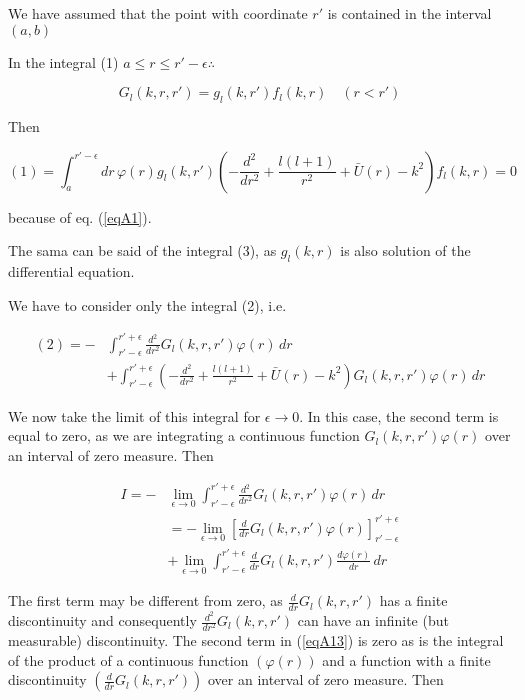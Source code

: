 We have assumed that the point with coordinate $r'$ is contained in the interval $(a,b)$

In the integral (1) $a\leq r  \leq r'-\epsilon \therefore $

\begin{equation*}
G_l(k,r,r')=g_l(k,r')f_l(k,r) \quad (r<  r')
\end{equation*}


Then

\begin{equation}\label{eqA11}
(1)=\int_a^{r'-\epsilon} dr\, \varphi(r) g_l(k,r') \left(-\frac{d^2}{dr^2}+ \frac{l(l+1)}{r^2}+\bar U(r)-k^2\right) f_l(k,r) =0
\end{equation}

because of eq. (\ref{eqA1}).

The sama can be said of the integral (3), as $g_l(k,r)$ is also solution of the differential equation.


We have to consider only the integral (2), i.e.

\begin{equation}\label{eqA12}
\begin{split}
(2)=-&\int_{r'-\epsilon}^{r'+\epsilon}  \frac{d^2}{dr^2} G_l(k,r,r') \varphi(r) \,dr \\
&+\int_{r'-\epsilon}^{r'+\epsilon} \left(-\frac{d^2}{dr^2}+ \frac{l(l+1)}{r^2}+\bar U(r)-k^2\right)
 G_l(k,r,r') \varphi(r) \,dr
\end{split}
\end{equation}

We now take the limit of this integral for $\epsilon \rightarrow 0$. In this case, the second term is equal to zero, as we are integrating a continuous function $G_l(k,r,r') \varphi(r)$ over an interval of zero measure. Then

\begin{equation}\label{eqA13}
\begin{split}
I=-&\lim_{\epsilon \rightarrow 0} \int_{r'-\epsilon}^{r'+\epsilon}  \frac{d^2}{dr^2} G_l(k,r,r') \varphi(r) \,dr \\
&=-\lim_{\epsilon \rightarrow 0} \left[ \frac{d}{dr} G_l(k,r,r') \varphi(r) \right]^{r'+\epsilon}_{r'-\epsilon}\\
&+\lim_{\epsilon \rightarrow 0} \int_{r'-\epsilon}^{r'+\epsilon}  \frac{d}{dr} G_l(k,r,r') \frac{d\varphi(r)}{dr} \,dr
\end{split}
\end{equation}

The first term may be different from zero, as $\frac{d}{dr} G_l(k,r,r')$ has a finite discontinuity and consequently $\frac{d^2}{dr^2} G_l(k,r,r')$ can have an infinite (but measurable) discontinuity. The second term in (\ref{eqA13}) is zero as is the integral of the product of a continuous function $(\varphi(r))$ and a function with a finite discontinuity $(\frac{d}{dr} G_l(k,r,r'))$ over an interval of zero measure. Then

